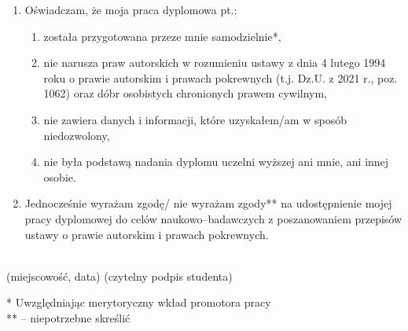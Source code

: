 \begin{enumerate}
    \item Oświadczam, że moja praca dyplomowa pt.: \@titlePL
          \begin{enumerate}[label=\arabic*)]
              \item została przygotowana przeze mnie samodzielnie*,
              \item nie narusza praw autorskich w rozumieniu ustawy z dnia 4 lutego 1994 roku o prawie autorskim i prawach pokrewnych (t.j. Dz.U. z 2021 r., poz. 1062) oraz dóbr osobistych chronionych prawem cywilnym,
              \item nie zawiera danych i informacji, które uzyskałem/am w sposób niedozwolony,
              \item nie była podstawą nadania dyplomu uczelni wyższej ani mnie, ani innej osobie.
          \end{enumerate}
    \item Jednocześnie wyrażam zgodę/ nie wyrażam zgody** na udostępnienie mojej pracy dyplomowej do celów naukowo--badawczych z poszanowaniem przepisów ustawy o prawie autorskim i prawach pokrewnych.
\end{enumerate}


\vspace*{10mm}

\noindent
\underline{\hspace{6cm}} \hfill \underline{\hspace{6cm}} \\ %
\hspace*{13mm}(miejscowość, data)  \hspace*{63mm}(czytelny podpis studenta)
\vspace*{10mm}

\vfill
\noindent
* Uwzględniając merytoryczny wkład promotora pracy \\
** -- niepotrzebne skreślić
